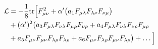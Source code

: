 \begin{equation}\begin{split}
{\cal L} &= -\frac18{\rm tr}\Big[F_{\mu\nu}^2 + \alpha'\big(a_1 F_{\mu\lambda}F_{\lambda\nu}F_{\nu\mu}\big)\\&
+(\alpha')^2\big(a_3F_{\mu\lambda}F_{\nu\lambda}F_{\mu\rho}F_{\nu\rho}
+a_4F_{\mu\lambda}F_{\nu\lambda}F_{\nu\rho}F_{\mu\rho}\\
&+a_5F_{\mu\nu}F_{\mu\nu}F_{\lambda\rho}F_{\lambda\rho}
+a_6F_{\mu\nu}F_{\lambda\rho}F_{\mu\nu}F_{\lambda\rho}\big)+\ldots
\Big]\end{split}\end{equation}

